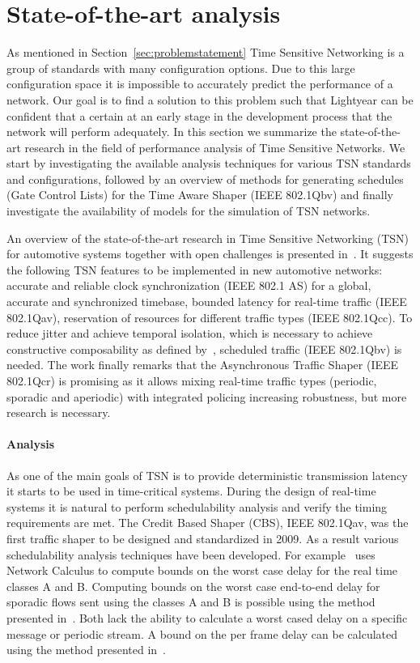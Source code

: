 \section{State-of-the-art analysis}
\label{sec:sota}
As mentioned in Section~\ref{sec:problemstatement} Time Sensitive Networking is a group of standards with many configuration options. Due to this large configuration space it is impossible to accurately predict the performance of a network. Our goal is to find a solution to this problem such that Lightyear can be confident that a certain at an early stage in the development process that the network will perform adequately. In this section we summarize the state-of-the-art research in the field of performance analysis of Time Sensitive Networks. We start by investigating the available analysis techniques for various TSN standards and configurations, followed by an overview of methods for generating schedules (Gate Control Lists) for the Time Aware Shaper (IEEE 802.1Qbv) and finally investigate the availability of models for the simulation of TSN networks.

An overview of the state-of-the-art research in Time Sensitive Networking (TSN) for automotive systems together with open challenges is presented in~\cite{ashjaei2021time}. It suggests the following TSN features to be implemented in new automotive networks: accurate and reliable clock synchronization (IEEE 802.1 AS) for a global, accurate and synchronized timebase, bounded latency for real-time traffic (IEEE 802.1Qav), reservation of resources for different traffic types (IEEE 802.1Qcc). To reduce jitter and achieve temporal isolation, which is necessary to achieve constructive composability as defined by~\cite{kopetz2003time}, scheduled traffic (IEEE 802.1Qbv) is needed. The work finally remarks that the Asynchronous Traffic Shaper (IEEE 802.1Qcr) is promising as it allows mixing real-time traffic types (periodic, sporadic and aperiodic) with integrated policing increasing robustness, but more research is necessary.

\paragraph{Analysis}
As one of the main goals of TSN is to provide deterministic transmission latency it starts to be used in time-critical systems. During the design of real-time systems it is natural to perform schedulability analysis and verify the timing requirements are met. The Credit Based Shaper (CBS), IEEE 802.1Qav, was the first traffic shaper to be designed and standardized in 2009. As a result various schedulability analysis techniques have been developed. For example~\cite{de2014complete} uses Network Calculus to compute bounds on the worst case delay for the real time classes A and B. Computing bounds on the worst case end-to-end delay for sporadic flows sent using the classes A and B is possible using the method presented in~\cite{li2017deterministic}. Both lack the ability to calculate a worst cased delay on a specific message or periodic stream. A bound on the per frame delay can be calculated using the method presented in~\cite{cao2016independent}. 


